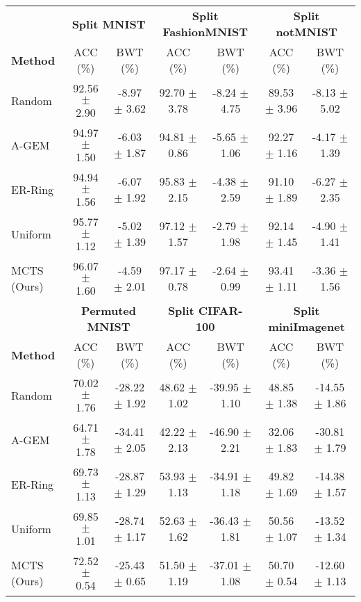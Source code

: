 \begin{tabular}{lcccccc}
	\toprule
	& \multicolumn{2}{c}{\textbf{Split MNIST}} & \multicolumn{2}{c}{\textbf{Split FashionMNIST}} & \multicolumn{2}{c}{\textbf{Split notMNIST}} \\ 
	\cmidrule(lr){2-3} \cmidrule(lr){4-5} \cmidrule(lr){6-7} 
	\textbf{Method} & ACC (\%)            & BWT (\%)           & ACC (\%)               & BWT (\%)               & ACC (\%)             & BWT (\%)             \\ \midrule
	Random          & 92.56 $\pm$ 2.90      & -8.97 $\pm$ 3.62     & 92.70 $\pm$ 3.78         & -8.24 $\pm$ 4.75         & 89.53 $\pm$ 3.96       & -8.13 $\pm$ 5.02       \\
	A-GEM           & 94.97 $\pm$ 1.50      & -6.03 $\pm$ 1.87     & 94.81 $\pm$ 0.86         & -5.65 $\pm$ 1.06         & 92.27 $\pm$ 1.16       & -4.17 $\pm$ 1.39       \\
	ER-Ring         & 94.94 $\pm$ 1.56      & -6.07 $\pm$ 1.92     & 95.83 $\pm$ 2.15         & -4.38 $\pm$ 2.59         & 91.10 $\pm$ 1.89       & -6.27 $\pm$ 2.35       \\
	Uniform      & 95.77 $\pm$ 1.12      & -5.02 $\pm$ 1.39     & 97.12 $\pm$ 1.57         & -2.79 $\pm$ 1.98         & 92.14 $\pm$ 1.45       & -4.90 $\pm$ 1.41       \\
	MCTS (Ours)            & 96.07 $\pm$ 1.60      & -4.59 $\pm$ 2.01     & 97.17 $\pm$ 0.78         & -2.64 $\pm$ 0.99         & 93.41 $\pm$ 1.11       & -3.36 $\pm$ 1.56      \\ \bottomrule \toprule
	& \multicolumn{2}{c}{\textbf{Permuted MNIST}} & \multicolumn{2}{c}{\textbf{Split CIFAR-100}} & \multicolumn{2}{c}{\textbf{Split miniImagenet}} \\ 
	\cmidrule(lr){2-3} \cmidrule(lr){4-5} \cmidrule(lr){6-7} 
	\textbf{Method} & ACC (\%)             & BWT (\%)             & ACC (\%)             & BWT (\%)              & ACC (\%)               & BWT (\%)               \\ \midrule
	Random          & 70.02 $\pm$ 1.76       & -28.22 $\pm$ 1.92      & 48.62 $\pm$ 1.02       & -39.95 $\pm$ 1.10       & 48.85 $\pm$ 1.38         & -14.55 $\pm$ 1.86        \\
	A-GEM           & 64.71 $\pm$ 1.78       & -34.41 $\pm$ 2.05      & 42.22 $\pm$ 2.13       & -46.90 $\pm$ 2.21       & 32.06 $\pm$ 1.83         & -30.81 $\pm$ 1.79        \\
	ER-Ring         & 69.73 $\pm$ 1.13       & -28.87 $\pm$ 1.29      & 53.93 $\pm$ 1.13       & -34.91 $\pm$ 1.18       & 49.82 $\pm$ 1.69         & -14.38 $\pm$ 1.57        \\
	Uniform      & 69.85 $\pm$ 1.01       & -28.74 $\pm$ 1.17      & 52.63 $\pm$ 1.62       & -36.43 $\pm$ 1.81       & 50.56 $\pm$ 1.07         & -13.52 $\pm$ 1.34        \\
	MCTS (Ours)            & 72.52 $\pm$ 0.54       & -25.43 $\pm$ 0.65      & 51.50 $\pm$ 1.19       & -37.01 $\pm$ 1.08       & 50.70 $\pm$ 0.54         & -12.60 $\pm$ 1.13       \\ \bottomrule
\end{tabular}
